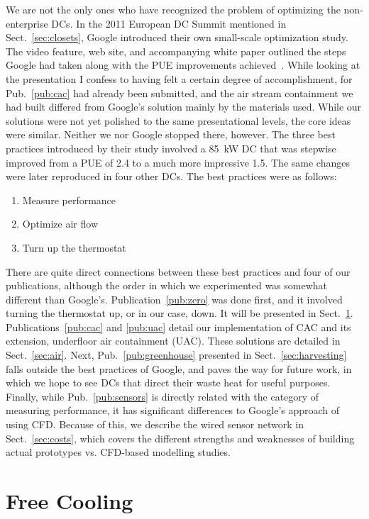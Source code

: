 \documentclass[officiallayout]{tktla}
\begin{document}
We are not the only ones who have recognized the problem of optimizing the
non-enterprise DCs. In the 2011 European DC Summit mentioned in
Sect.~\ref{sec:closets}, Google introduced their own small-scale optimization
study. The video feature, web site, and accompanying white paper outlined the
steps Google had taken along with the PUE improvements
achieved~\cite{Google2011}.  While looking at the presentation I confess to
having felt a certain degree of accomplishment, for Pub.~\ref{pub:cac} had
already been submitted, and the air stream containment we had built differed
from Google's solution mainly by the materials used. While our solutions were
not yet polished to the same presentational levels, the core ideas were
similar. Neither we nor Google stopped there, however. The three best
practices introduced by their study involved a 85~kW DC that was stepwise
improved from a PUE of 2.4 to a much more impressive 1.5. The same changes
were later reproduced in four other DCs. The best practices were as follows:

\begin{enumerate}
  \item{Measure performance}
  \item{Optimize air flow}
  \item{Turn up the thermostat}
\end{enumerate}

There are quite direct connections between these best practices and four of
our publications, although the order in which we experimented was somewhat
different than Google's. Publication~\ref{pub:zero} was done first, and it
involved turning the thermostat up, or in our case, down. It will be presented
in Sect.~\ref{sec:free}.  Publications~\ref{pub:cac} and \ref{pub:uac} detail
our implementation of CAC and its extension, underfloor air containment (UAC).
These solutions are detailed in Sect.~\ref{sec:air}. Next,
Pub.~\ref{pub:greenhouse} presented in Sect.~\ref{sec:harvesting} falls
outside the best practices of Google, and paves the way for future work, in
which we hope to see DCs that direct their waste heat for useful purposes.
Finally, while Pub.~\ref{pub:sensors} is directly related with the category of
measuring performance, it has significant differences to Google's approach of
using CFD. Because of this, we describe the wired sensor network in
Sect.~\ref{sec:costs}, which covers the different strengths and weaknesses of
building actual prototypes vs. CFD-based modelling studies.


\section{Free Cooling}
\label{sec:free}
\end{document}
